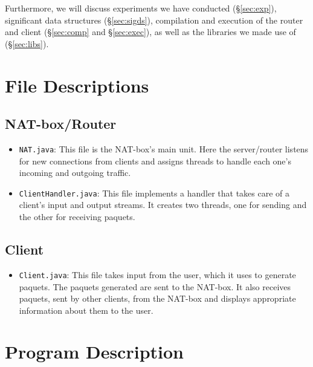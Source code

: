\documentclass[10pt, a4paper]{article}
\begin{document}
Furthermore, we will discuss experiments we have conducted (\S\ref{sec:exp}),
significant data structures (\S\ref{sec:sigds}), compilation and execution of
the router and client (\S\ref{sec:comp} and \S\ref{sec:exec}), as well as the
libraries we made use of (\S\ref{sec:libs}).



\section{File Descriptions}
\label{sec:fdesc}


\subsection{NAT-box/Router}
\label{ssec:natfdesc}

\begin{itemize}
  \item \texttt{NAT.java}: This file is the NAT-box's main unit. Here the
    server/router listens for new connections from clients and assigns threads
    to handle each one's incoming and outgoing traffic.
  \item \texttt{ClientHandler.java}: This file implements a handler that takes
    care of a client's input and output streams. It creates two threads, one for
    sending and the other for receiving paquets.
\end{itemize}


\subsection{Client}
\label{ssec:clifdesc}

\begin{itemize}
  \item \texttt{Client.java}: This file takes input from the user, which it uses
    to generate paquets. The paquets generated are sent to the NAT-box. It also
    receives paquets, sent by other clients, from the NAT-box and displays
    appropriate information about them to the user.
\end{itemize}



\section{Program Description}
\label{sec:pdesc}
\end{document}
